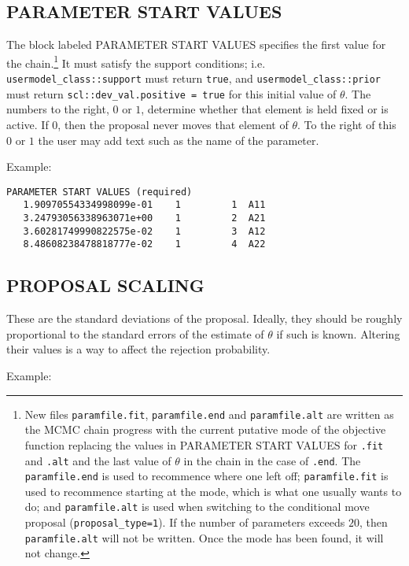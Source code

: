 \documentclass[11pt, letterpaper, notitlepage]{article}
\begin{document}
\subsection{PARAMETER START VALUES}

The block labeled PARAMETER START VALUES specifies the first value for the chain.\footnote{New files \texttt{paramfile.fit}, \texttt{paramfile.end} and \texttt{paramfile.alt} are written as the MCMC chain progress with the current putative mode of the objective function replacing the values in PARAMETER START VALUES for \texttt{.fit} and \texttt{.alt} and the last value of $\theta$ in the chain in the case of \texttt{.end}. The \texttt{paramfile.end} is used to recommence where one left off; \texttt{paramfile.fit} is used to recommence starting at the mode, which is what one usually wants to do; and \texttt{paramfile.alt} is used when switching to the conditional move proposal (\texttt{proposal\_type=1}). If the number of parameters exceeds $20$, then \texttt{paramfile.alt} will not be written. Once the mode has been found, it will not change.} It must satisfy the support conditions; i.e. \texttt{usermodel\_class::support} must return \texttt{true}, and \texttt{usermodel\_class::prior} must return \texttt{scl::dev\_val.positive = true} for this initial value of $\theta$. The numbers to the right, $0$ or $1$, determine whether that element is held fixed or is active. If $0$, then the proposal never moves that element of $\theta$. To the right of this $0$ or $1$ the user may add text such as the name of the parameter.

Example:

\begin{verbatim}
PARAMETER START VALUES (required)
   1.90970554334998099e-01    1         1  A11
   3.24793056338963071e+00    1         2  A21
   3.60281749990822575e-02    1         3  A12
   8.48608238478818777e-02    1         4  A22
\end{verbatim}



\subsection{PROPOSAL SCALING}

These are the standard deviations of the proposal. Ideally, they should be roughly proportional to the standard errors of the estimate of $\theta$ if such is known. Altering their values is a way to affect the rejection probability.

Example:
\end{document}
